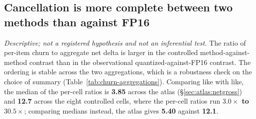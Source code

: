 \subsection{Cancellation is more complete between two methods than against FP16}
\label{sec:minigrid:churnratio}

\begin{result}\label{res:churnratio}
\emph{Descriptive; not a registered hypothesis and not an inferential test.}
The ratio of per-item churn to aggregate net delta is larger in the
controlled method-against-method contrast than in the observational
quantized-against-FP16 contrast. The ordering is stable across the two
aggregations, which is a robustness check on the choice of summary
(Table~\ref{tab:churn-aggregations}).
Comparing like with like, the
median of the per-cell ratios is \textbf{3.85} across the atlas
(\S\ref{sec:atlas:netgross}) and \textbf{12.7} across the eight controlled
cells, where the per-cell ratios run \textbf{$3.0\times$ to $30.5\times$};
comparing medians instead, the atlas gives \textbf{5.40} against
\textbf{12.1}.
\end{result}

